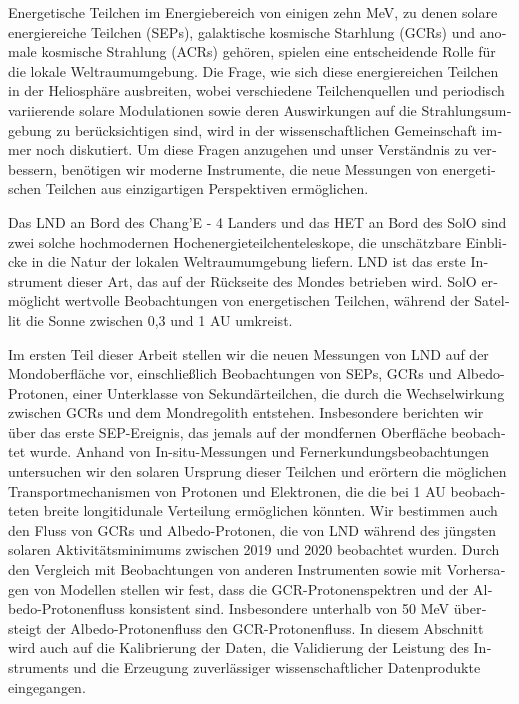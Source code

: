 \begin{otherlanguage}{ngerman}
    Energetische Teilchen im Energiebereich von einigen zehn MeV, zu denen solare energiereiche Teilchen (SEPs), galaktische kosmische Starhlung (GCRs) und anomale kosmische Strahlung (ACRs) gehören, spielen eine entscheidende Rolle für die lokale Weltraumumgebung. Die Frage, wie sich diese energiereichen Teilchen in der Heliosphäre ausbreiten, wobei verschiedene Teilchenquellen und periodisch variierende solare Modulationen sowie deren Auswirkungen auf die Strahlungsumgebung zu berücksichtigen sind, wird in der wissenschaftlichen Gemeinschaft immer noch diskutiert. Um diese Fragen anzugehen und unser Verständnis zu verbessern, benötigen wir moderne Instrumente, die neue Messungen von energetischen Teilchen aus einzigartigen Perspektiven ermöglichen.

    Das \ac{LND} an Bord des Chang'E - 4 Landers und das \ac{HET} an Bord des \ac{SolO} sind zwei solche hochmodernen Hochenergieteilchenteleskope, die unschätzbare Einblicke in die Natur der lokalen Weltraumumgebung liefern. \ac{LND} ist das erste Instrument dieser Art, das auf der Rückseite des Mondes betrieben wird. \ac{SolO} ermöglicht wertvolle Beobachtungen von energetischen Teilchen, w\"{a}hrend der Satellit die Sonne zwischen 0,3 und 1 AU umkreist.
    
    Im ersten Teil dieser Arbeit stellen wir die neuen Messungen von \ac{LND} auf der Mondoberfläche vor, einschließlich Beobachtungen von \acp{SEP}, \acp{GCR} und Albedo-Protonen, einer Unterklasse von Sekundärteilchen, die durch die Wechselwirkung zwischen \acp{GCR} und dem Mondregolith entstehen. Insbesondere berichten wir über das erste \ac{SEP}-Ereignis, das jemals auf der mondfernen Oberfläche beobachtet wurde. Anhand von In-situ-Messungen und Fernerkundungsbeobachtungen untersuchen wir den solaren Ursprung dieser Teilchen und erörtern die möglichen Transportmechanismen von Protonen und Elektronen, die die bei 1 AU beobachteten breite longitidunale Verteilung ermöglichen könnten. Wir bestimmen auch den Fluss von \acp{GCR} und Albedo-Protonen, die von \ac{LND} während des jüngsten solaren Aktivitätsminimums zwischen 2019 und 2020 beobachtet wurden. Durch den Vergleich mit Beobachtungen von anderen Instrumenten sowie mit Vorhersagen von Modellen stellen wir fest, dass die \ac{GCR}-Protonenspektren und der Albedo-Protonenfluss konsistent sind. Insbesondere unterhalb von 50 MeV übersteigt der Albedo-Protonenfluss den \ac{GCR}-Protonenfluss.
    In diesem Abschnitt wird auch auf die Kalibrierung der Daten, die Validierung der Leistung des Instruments und die Erzeugung zuverlässiger wissenschaftlicher Datenprodukte eingegangen.
    

\end{otherlanguage}
